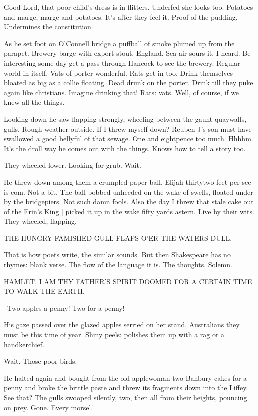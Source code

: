 Good Lord, that poor child's dress is in flitters.
Underfed she looks too.
Potatoes and marge, marge and potatoes.
It's after they feel it.
Proof of the pudding.
Undermines the constitution.

As he set foot on O'Connell bridge
a puffball of smoke plumed up from the parapet.
Brewery barge with export stout.
England.
Sea air sours it, I heard.
Be interesting some day get a pass through Hancock to see the brewery.
Regular world in itself.
Vats of porter wonderful.
Rats get in too.
Drink themselves bloated as big as a collie floating.
Dead drunk on the porter.
Drink till they puke again like christians.
Imagine drinking that!
Rats: vats.
Well, of course,
if we knew all the things.

Looking down
he saw flapping strongly,
wheeling between the gaunt quaywalls,
gulls.
Rough weather outside.
If I threw myself down?
Reuben J's son must have swallowed a good bellyful of that sewage.
One and eightpence too much.
Hhhhm.
It's the droll way he comes out with the things.
Knows how to tell a story too.

They wheeled lower.
Looking for grub.
Wait.

He threw down among them a crumpled paper ball.
Elijah thirtytwo feet per sec is com.
Not a bit.
The ball bobbed unheeded on the wake of swells,
floated under by the bridgepiers.
Not such damn fools.
Also the day I threw that stale cake out of the Erin's King |
picked it up in the wake fifty yards astern.
Live by their wits.
They wheeled,
flapping.

    THE HUNGRY FAMISHED GULL
    FLAPS O'ER THE WATERS DULL.

That is how poets write, the similar sounds.
But then Shakespeare has no rhymes:
blank verse.
The flow of the language it is.
The thoughts.
Solemn.

    HAMLET, I AM THY FATHER'S SPIRIT
    DOOMED FOR A CERTAIN TIME TO WALK THE EARTH.

--Two apples a penny!
Two for a penny!

His gaze passed over the glazed apples
serried on her stand.
Australians they must be this time of year.
Shiny peels:
polishes them up
with a rag or a handkerchief.

Wait.
Those poor birds.

He halted again and bought from the old applewoman
two Banbury cakes for a penny
and broke the brittle paste
and threw its fragments down into the Liffey.
See that?
The gulls swooped silently,
two,
then all from their heights,
pouncing on prey.
Gone.
Every morsel.

